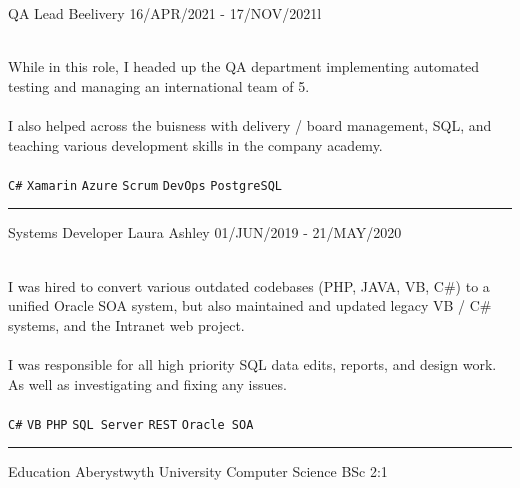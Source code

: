 \documentclass[12pt]{developercv}
\begin{document}
\begin{minipage}[t]{0.81\textwidth}
\begin{entrylist}
\entry
	{}
	{QA Lead \footnotesize\textmd{Beelivery}}
	{16/APR/2021 - 17/NOV/2021l}
	{
		{
\\
While in this role, I headed up the QA department implementing automated testing and managing an international team of 5.
\\\\
 I also helped across the buisness with delivery / board management, SQL, and teaching various development skills in the company academy.
\\\\
		}
	\texttt{C\#}\slashsep
	\texttt{Xamarin}\slashsep
	\texttt{Azure}\slashsep
	\texttt{Scrum}\slashsep
	\texttt{DevOps}\slashsep
	\texttt{PostgreSQL}

	\vspace{\baselineskip}
	\hrule
	}


\entry
	{}
	{Systems Developer \footnotesize\textmd{Laura Ashley}}
	{01/JUN/2019 - 21/MAY/2020}
	{
		{
\\
I was hired to convert various outdated codebases (PHP, JAVA, VB, C\#) to a unified Oracle SOA system, but also maintained and updated legacy VB / C\# systems, and the Intranet web project.
\\\\
I was responsible for all high priority SQL data edits, reports, and design work. As well as investigating and fixing any issues.
\\\\
		}
		\texttt{C\#}\slashsep
		\texttt{VB}\slashsep
		\texttt{PHP}\slashsep
		\texttt{SQL Server}\slashsep
		\texttt{REST}\slashsep
		\texttt{Oracle SOA}

	\vspace{\baselineskip}
	\hrule
	}


\entry
	{}
	{Education}
	{Aberystwyth University}
	{
	Computer Science BSc \hfill 2:1
	}


\end{entrylist}



\end{minipage}
\end{document}
